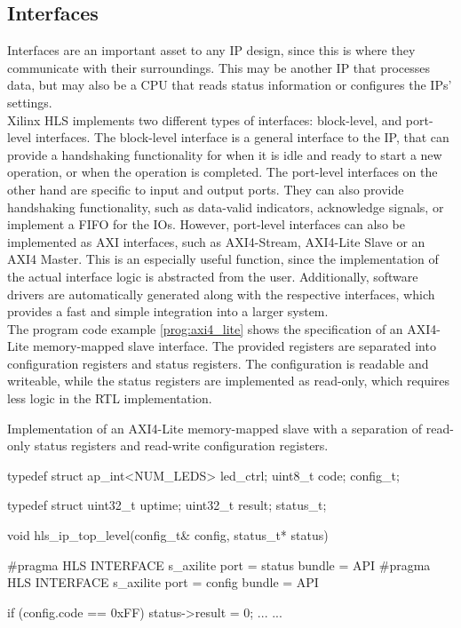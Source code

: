 \subsection{Interfaces}

Interfaces are an important asset to any IP design, since this is where they communicate with their surroundings.
This may be another IP that processes data, but may also be a CPU that reads status information or configures the IPs' settings.\\

Xilinx HLS implements two different types of interfaces: block-level, and port-level interfaces.
The block-level interface is a general interface to the IP, that can provide a handshaking functionality for when it is idle and ready to start a new operation, or when the operation is completed.
The port-level interfaces on the other hand are specific to input and output ports.
They can also provide handshaking functionality, such as data-valid indicators, acknowledge signals, or implement a FIFO for the IOs.
However, port-level interfaces can also be implemented as AXI interfaces, such as AXI4-Stream, AXI4-Lite Slave or an AXI4 Master.
This is an especially useful function, since the implementation of the actual interface logic is abstracted from the user.
Additionally, software drivers are automatically generated along with the respective interfaces, which provides a fast and simple integration into a larger system.\\

The program code example \ref{prog:axi4_lite} shows the specification of an AXI4-Lite memory-mapped slave interface.
The provided registers are separated into configuration registers and status registers.
The configuration is readable and writeable, while the status registers are implemented as read-only, which requires less logic in the RTL implementation.\\

\begin{program}
  \caption{Implementation of an AXI4-Lite memory-mapped slave with a separation of read-only status registers and read-write configuration registers.}
  \label{prog:axi4_lite}
\begin{CppCode}
 typedef struct {
   ap_int<NUM_LEDS> led_ctrl;
   uint8_t code;
 } config_t;

 typedef struct {
   uint32_t uptime;
   uint32_t result;
 } status_t;

 void hls_ip_top_level(config_t& config,
                       status_t* status) {
     #pragma HLS INTERFACE s_axilite port = status bundle = API
     #pragma HLS INTERFACE s_axilite port = config bundle = API

     if (config.code == 0xFF) {
       status->result = 0;
       ...
     }
     ...
 }
\end{CppCode}
\end{program}


